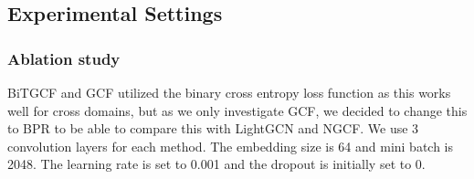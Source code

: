 \subsection{Experimental Settings}

\subsubsection{Ablation study}
BiTGCF and GCF utilized the binary cross entropy loss function as this works well for cross domains, but as we only investigate GCF, we decided to change this to BPR to be able to compare this with LightGCN and NGCF.
We use 3 convolution layers for each method.
The embedding size is 64 and mini batch is 2048.
The learning rate is set to 0.001 and the dropout is initially set to 0.